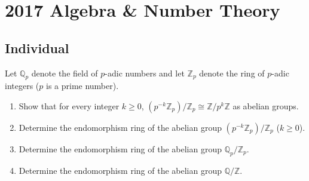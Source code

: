 \section{2017 Algebra \& Number Theory}

\subsection*{Individual}
\begin{exercise}
\label{algebra:2017:1}
Let $\mathbb{Q}_p$ denote the field of $p$-adic numbers and let $\mathbb{Z}_p$ denote the ring of $p$-adic integers ($p$ is a prime number).

\begin{enumerate}
\item Show that for every integer $k \geq 0$, $(p^{-k}\mathbb{Z}_p)/\mathbb{Z}_p \cong \mathbb{Z}/p^k\mathbb{Z}$ as abelian groups.

\item Determine the endomorphism ring of the abelian group $(p^{-k}\mathbb{Z}_p)/\mathbb{Z}_p$ ($k \geq 0$).

\item Determine the endomorphism ring of the abelian group $\mathbb{Q}_p/\mathbb{Z}_p$.

\item Determine the endomorphism ring of the abelian group $\mathbb{Q}/\mathbb{Z}$.
\end{enumerate}
\end{exercise}
